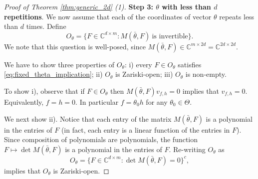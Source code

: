 \documentclass[reqno,a4paper,11pt]{amsart}
\numberwithin{equation}{section}
\def\C{{\mathbb C}}
\newcommand\1{\mathds{1}}
\begin{document}
\begin{proof}[Proof of Theorem \ref{thm:generic_2d} (1)]
\textbf{Step 3: $\theta$ with less than $d$ repetitions}. We now assume that each of the coordinates of vector $\theta$ repeats less than $d$ times. Define
$$
O_\theta = \{ F \in \C^{d \times m} : M(\bar{\theta},F) \ \text{is invertible} \}.
$$
We note that this question is well-posed, since $M(\bar{\theta},F) \in \C^{m \times 2d} = \C^{2d \times 2d}$.

We have to show three properties of $O_\theta$: i) every $F \in O_\theta$ satisfies \eqref{eq:fixed_theta_implication}; ii) $O_\theta$ is Zariski-open; iii) $O_\theta$ is non-empty.

To show i), observe that if $F \in O_\theta$ then $M(\bar{\theta}, F ) v_{f,h} = 0$ implies that $v_{f,h}=0$. Equivalently, $f=h=0$. In particular $f=\theta_0 h$ for any $\theta_0 \in \Theta$.

We next show ii). Notice that each entry of the matrix $M(\bar{\theta},F)$ is a polynomial in the entries of $F$ (in fact, each entry is a linear function of the entries in $F$). Since composition of polynomials are polynomials, the function $F \mapsto \det M(\bar{\theta},F)$ is a polynomial in the entries of $F$. Re-writing $O_\theta$ as
$$
O_\theta = \{ F \in \C^{d \times m} : \det M(\bar{\theta},F) = 0 \}^c,
$$
implies that $O_\theta$ is Zariski-open.


\end{proof}
\end{document}
